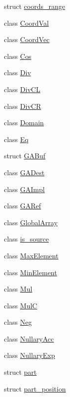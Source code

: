 \begin{DoxyCompactItemize}
\item 
struct \hyperlink{structshark_1_1ndim_1_1coords__range}{coords\+\_\+range}
\item 
class \hyperlink{classshark_1_1ndim_1_1_coord_val}{Coord\+Val}
\item 
class \hyperlink{classshark_1_1ndim_1_1_coord_vec}{Coord\+Vec}
\item 
class \hyperlink{classshark_1_1ndim_1_1_cos}{Cos}
\item 
class \hyperlink{classshark_1_1ndim_1_1_div}{Div}
\item 
class \hyperlink{classshark_1_1ndim_1_1_div_c_l}{Div\+CL}
\item 
class \hyperlink{classshark_1_1ndim_1_1_div_c_r}{Div\+CR}
\item 
class \hyperlink{classshark_1_1ndim_1_1_domain}{Domain}
\item 
class \hyperlink{classshark_1_1ndim_1_1_eq}{Eq}
\item 
struct \hyperlink{classshark_1_1ndim_1_1_g_a_buf}{G\+A\+Buf}
\item 
class \hyperlink{classshark_1_1ndim_1_1_g_a_dest}{G\+A\+Dest}
\item 
class \hyperlink{classshark_1_1ndim_1_1_g_a_impl}{G\+A\+Impl}
\item 
class \hyperlink{classshark_1_1ndim_1_1_g_a_ref}{G\+A\+Ref}
\item 
class \hyperlink{classshark_1_1ndim_1_1_global_array}{Global\+Array}
\item 
class \hyperlink{classshark_1_1ndim_1_1is__source}{is\+\_\+source}
\item 
class \hyperlink{classshark_1_1ndim_1_1_max_element}{Max\+Element}
\item 
class \hyperlink{classshark_1_1ndim_1_1_min_element}{Min\+Element}
\item 
class \hyperlink{classshark_1_1ndim_1_1_mul}{Mul}
\item 
class \hyperlink{classshark_1_1ndim_1_1_mul_c}{MulC}
\item 
class \hyperlink{classshark_1_1ndim_1_1_neg}{Neg}
\item 
class \hyperlink{classshark_1_1ndim_1_1_nullary_acc}{Nullary\+Acc}
\item 
class \hyperlink{classshark_1_1ndim_1_1_nullary_exp}{Nullary\+Exp}
\item 
struct \hyperlink{structshark_1_1ndim_1_1part}{part}
\item 
struct \hyperlink{structshark_1_1ndim_1_1part__position}{part\+\_\+position}
\item 

\end{DoxyCompactItemize}
